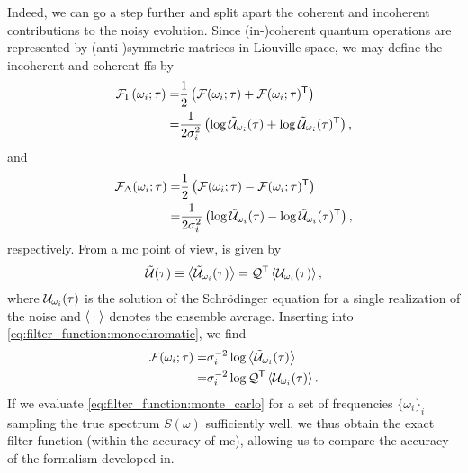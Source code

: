 Indeed, we can go a step further and split apart the coherent and incoherent contributions to the noisy evolution.
Since (in-)coherent quantum operations are represented by (anti-)symmetric matrices in Liouville space, we may define the incoherent and coherent \glspl{ff} by
\begin{equation}
    \label{eq:filter_function:monte_carlo:incoherent}
    \begin{split}
        \mathcal{F}_\Gamma(\omega_i;\tau) =& \frac{1}{2}\left(\mathcal{F}(\omega_i;\tau) + \mathcal{F}(\omega_i;\tau)^\mathsf{T}\right) \\
                                     =& \frac{1}{2\sigma_i^2}\left(\log\mathcal{\tilde{U}}_{\omega_i}(\tau) + \log\mathcal{\tilde{U}}_{\omega_i}(\tau)^\mathsf{T}\right),
    \end{split}
\end{equation}
and
\begin{equation}
    \label{eq:filter_function:monte_carlo:coherent}
    \begin{split}
        \mathcal{F}_\Delta(\omega_i;\tau) =& \frac{1}{2}\left(\mathcal{F}(\omega_i;\tau) - \mathcal{F}(\omega_i;\tau)^\mathsf{T}\right) \\
                                     =& \frac{1}{2\sigma_i^2}\left(\log\mathcal{\tilde{U}}_{\omega_i}(\tau) - \log\mathcal{\tilde{U}}_{\omega_i}(\tau)^\mathsf{T}\right),
    \end{split}
\end{equation}
respectively.
From a \gls{mc} point of view, \liouvUe is given by
\begin{align}
    \liouvUe(\tau) \equiv \expval{\liouvUe_{\omega_i}(\tau)} = \liouvQ\transpose \expval{\liouvU_{\omega_i}(\tau)},
\end{align}
where $\mathcal{U}_{\omega_i}(\tau)$ is the solution of the Schrödinger equation for a single realization of the noise and $\expval{\:\cdot\:}$ denotes the ensemble average.
Inserting into \cref{eq:filter_function:monochromatic}, we find
\begin{equation}
    \label{eq:filter_function:monte_carlo}
    \begin{split}
        \mc{F}(\omega_i; \tau) =& \sigma_i^{-2}\log\expval{\liouvUe_{\omega_i}(\tau)} \\
                               =& \sigma_i^{-2}\log\liouvQ\transpose\expval{\liouvU_{\omega_i}(\tau)}.
    \end{split}
\end{equation}
If we evaluate \cref{eq:filter_function:monte_carlo} for a set of frequencies $\lbrace\omega_i\rbrace_i$ sampling the true spectrum $S(\omega)$ sufficiently well, we thus obtain the exact filter function \FF (within the accuracy of \gls{mc}), allowing us to compare the accuracy of the formalism developed in.


